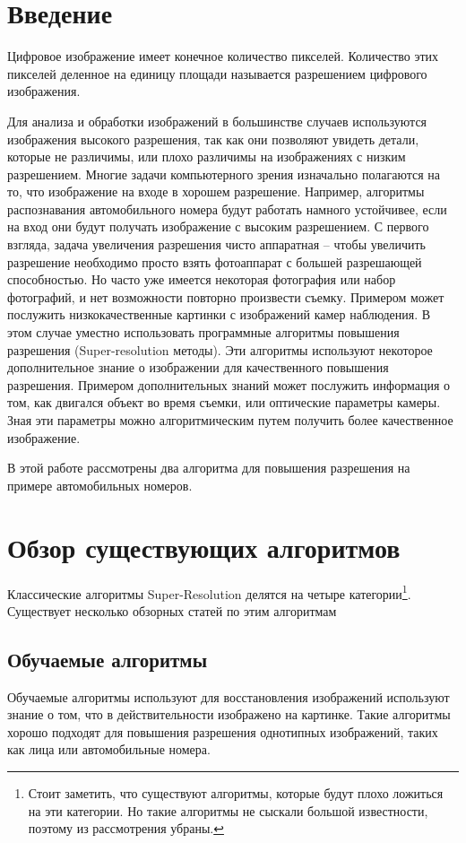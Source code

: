 \section{Введение}
Цифровое изображение имеет конечное количество пикселей. Количество этих пикселей деленное на единицу площади называется
разрешением цифрового изображения.

Для анализа и обработки изображений в большинстве случаев используются изображения высокого разрешения, так как они
позволяют увидеть детали, которые не различимы, или плохо различимы на изображениях с низким разрешением. Многие задачи
компьютерного зрения изначально полагаются на то, что изображение на входе в хорошем разрешение. Например, алгоритмы
распознавания автомобильного номера будут работать намного устойчивее, если на вход они будут получать изображение с
высоким разрешением. С первого взгляда,
задача увеличения разрешения чисто аппаратная -- чтобы увеличить разрешение необходимо просто взять фотоаппарат с
большей разрешающей способностью. Но часто уже имеется некоторая фотография или набор фотографий, и нет возможности
повторно произвести съемку. Примером может послужить низкокачественные картинки с изображений камер наблюдения. В этом
случае уместно использовать программные алгоритмы повышения разрешения (Super-resolution методы).  Эти алгоритмы
используют некоторое дополнительное знание о изображении для качественного повышения разрешения. Примером
дополнительных знаний может послужить информация о том, как двигался объект во время съемки, или оптические параметры
камеры. Зная эти параметры можно алгоритмическим путем получить более качественное изображение.

В этой работе рассмотрены два алгоритма для повышения разрешения на примере автомобильных номеров.

\section{Обзор существующих алгоритмов} Классические алгоритмы Super-Resolution делятся на четыре
категории\footnote{Стоит заметить, что существуют алгоритмы, которые будут плохо ложиться на эти категории. Но такие
алгоритмы не сыскали большой известности, поэтому из рассмотрения убраны.}.  Существует несколько обзорных статей по
этим алгоритмам \cite{ParkS.C.2003,tian2011survey}

\subsection{Обучаемые алгоритмы}
Обучаемые алгоритмы используют для восстановления изображений используют знание о том, что в действительности изображено
на картинке. Такие алгоритмы хорошо подходят для повышения разрешения однотипных изображений, таких как лица или
автомобильные номера.

